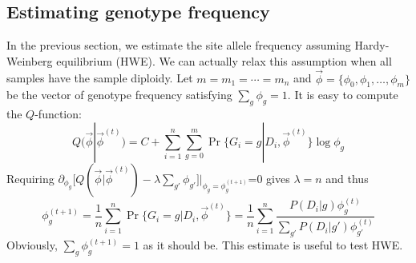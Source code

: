 \documentclass[pdftex,10pt]{book}
\begin{document}
\subsection{Estimating genotype frequency}
In the previous section, we estimate the site allele frequency assuming Hardy-Weinberg equilibrium (HWE).
We can actually relax this assumption when all samples have the sample diploidy.
Let $m=m_1=\cdots=m_n$ and $\vec{\phi}=\{\phi_0,\phi_1,\ldots,\phi_m\}$ be the vector of
genotype frequency satisfying $\sum_g\phi_g=1$. It is easy to compute the $Q$-function:
$$
Q(\vec{\phi}|\vec{\phi}^{(t)})=C+\sum_{i=1}^n\sum_{g=0}^m\Pr\{G_i=g|D_i,\vec{\phi}^{(t)}\}\log\phi_g
$$
Requiring $\partial_{\phi_g}\big[Q(\vec{\phi}|\vec{\phi}^{(t)})-\lambda\sum_{g'}\phi_{g'}\big]\Big|_{\phi_g=\phi_g^{(t+1)}}$=0 gives $\lambda=n$
and thus
$$
\phi_g^{(t+1)}=\frac{1}{n}\sum_{i=1}^n\Pr\{G_i=g|D_i,\vec{\phi}^{(t)}\}=\frac{1}{n}\sum_{i=1}^n\frac{P(D_i|g)\phi_g^{(t)}}{\sum_{g'}P(D_i|g')\phi_{g'}^{(t)}}
$$
Obviously, $\sum_g\phi_g^{(t+1)}=1$ as it should be. This estimate is useful to test HWE.
\end{document}

